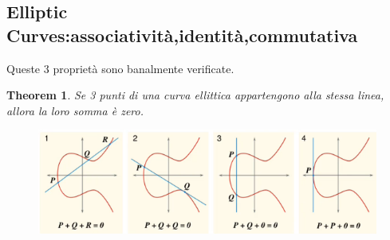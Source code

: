 \documentclass{book}
\newtheorem{theorem}{Theorem}[section]
\begin{document}
\subsection{Elliptic Curves:associatività,identità,commutativa}
Queste 3 proprietà sono banalmente verificate.
\begin{theorem}
	Se 3 punti di una curva ellittica appartengono alla stessa linea, allora la loro somma è zero.
	\begin{figure}[h]
		\centering
		\includegraphics[scale=0.5]{2022-01-11-15-31-30.png}%
	\end{figure}
\end{theorem}
\end{document}
